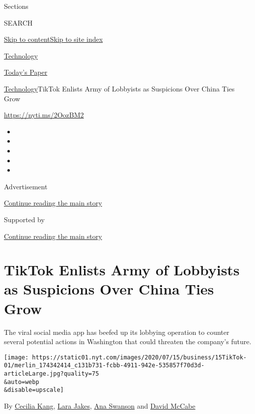 Sections

SEARCH

\protect\hyperlink{site-content}{Skip to
content}\protect\hyperlink{site-index}{Skip to site index}

\href{https://www.nytimes.com/section/technology}{Technology}

\href{https://myaccount.nytimes.com/auth/login?response_type=cookie\&client_id=vi}{}

\href{https://www.nytimes.com/section/todayspaper}{Today's Paper}

\href{/section/technology}{Technology}\textbar{}TikTok Enlists Army of
Lobbyists as Suspicions Over China Ties Grow

\url{https://nyti.ms/2OozBM2}

\begin{itemize}
\item
\item
\item
\item
\item
\end{itemize}

Advertisement

\protect\hyperlink{after-top}{Continue reading the main story}

Supported by

\protect\hyperlink{after-sponsor}{Continue reading the main story}

\hypertarget{tiktok-enlists-army-of-lobbyists-as-suspicions-over-china-ties-grow}{%
\section{TikTok Enlists Army of Lobbyists as Suspicions Over China Ties
Grow}\label{tiktok-enlists-army-of-lobbyists-as-suspicions-over-china-ties-grow}}

The viral social media app has beefed up its lobbying operation to
counter several potential actions in Washington that could threaten the
company's future.

\texttt{[image: https://static01.nyt.com/images/2020/07/15/business/15TikTok-01/merlin\_174342414\_c131b731-fcbb-4911-942e-535857f70d3d-articleLarge.jpg?quality=75\\\&auto=webp\\\&disable=upscale]}

By \href{https://www.nytimes.com/by/cecilia-kang}{Cecilia Kang},
\href{https://www.nytimes.com/by/lara-jakes}{Lara Jakes},
\href{https://www.nytimes.com/by/ana-swanson}{Ana Swanson} and
\href{https://www.nytimes.com/by/david-mccabe}{David McCabe}

